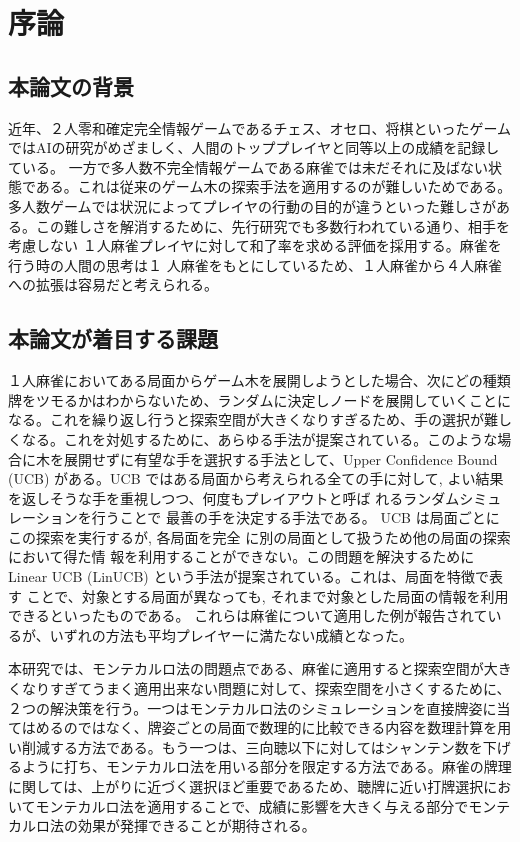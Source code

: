 \chapter{序論}
\label{chap:introduction}
\section{本論文の背景}
近年、２人零和確定完全情報ゲームであるチェス、オセロ、将棋といったゲームではAIの研究がめざましく、人間のトッププレイヤと同等以上の成績を記録している。
一方で多人数不完全情報ゲームである麻雀では未だそれに及ばない状態である。これは従来のゲーム木の探索手法を適用するのが難しいためである。
多人数ゲームでは状況によってプレイヤの行動の目的が違うといった難しさがある。この難しさを解消するために、先行研究\cite{LinUCB_mahjong}\cite{bakuuti2013}でも多数行われている通り、相手を考慮しない １人麻雀プレイヤに対して和了率を求める評価を採用する。麻雀を行う時の人間の思考は１ 人麻雀をもとにしているため、１人麻雀から４人麻雀への拡張は容易だと考えられる。

\section{本論文が着目する課題}
１人麻雀においてある局面からゲーム木を展開しようとした場合、次にどの種類牌をツモるかはわからないため、ランダムに決定しノードを展開していくことになる。これを繰り返し行うと探索空間が大きくなりすぎるため、手の選択が難しくなる。これを対処するために、あらゆる手法が提案されている。このような場合に木を展開せずに有望な手を選択する手法として、Upper Confidence Bound (UCB) \cite{UCB}がある。UCB ではある局面から考えられる全ての手に対して, よい結果 を返しそうな手を重視しつつ、何度もプレイアウトと呼ば れるランダムシミュレーションを行うことで 最善の手を決定する手法である。
UCB は局面ごとにこの探索を実行するが, 各局面を完全 に別の局面として扱うため他の局面の探索において得た情 報を利用することができない。この問題を解決するためにLinear UCB (LinUCB) \cite{LinUCB} という手法が提案されている。これは、局面を特徴で表す ことで、対象とする局面が異なっても, それまで対象とした局面の情報を利用できるといったものである。
これらは麻雀について適用した例が報告されている\cite{LinUCB_mahjong}が、いずれの方法も平均プレイヤーに満たない成績となった。

本研究では、モンテカルロ法の問題点である、麻雀に適用すると探索空間が大きくなりすぎてうまく適用出来ない問題に対して、探索空間を小さくするために、２つの解決策を行う。一つはモンテカルロ法のシミュレーションを直接牌姿に当てはめるのではなく、牌姿ごとの局面で数理的に比較できる内容を数理計算を用い削減する方法である。もう一つは、三向聴以下に対してはシャンテン数を下げるように打ち、モンテカルロ法を用いる部分を限定する方法である。麻雀の牌理に関しては、上がりに近づく選択ほど重要である\cite{gendai}ため、聴牌に近い打牌選択においてモンテカルロ法を適用することで、成績に影響を大きく与える部分でモンテカルロ法の効果が発揮できることが期待される。
